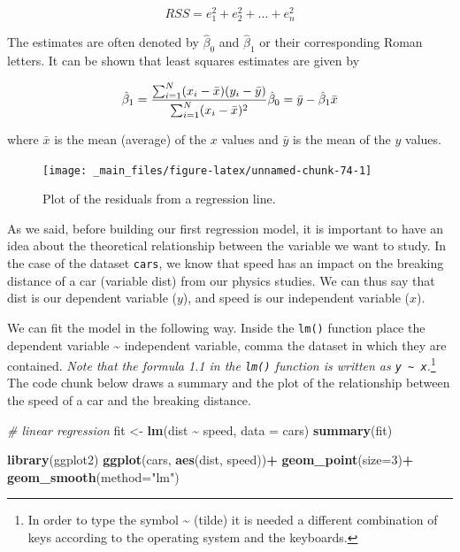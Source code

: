 \documentclass[
]{article}
\newenvironment{Shaded}{\begin{snugshade}}{\end{snugshade}}
\newcommand{\AttributeTok}[1]{\textcolor[rgb]{0.13,0.29,0.53}{#1}}
\newcommand{\CommentTok}[1]{\textcolor[rgb]{0.56,0.35,0.01}{\textit{#1}}}
\newcommand{\DecValTok}[1]{\textcolor[rgb]{0.00,0.00,0.81}{#1}}
\newcommand{\FunctionTok}[1]{\textcolor[rgb]{0.13,0.29,0.53}{\textbf{#1}}}
\newcommand{\NormalTok}[1]{#1}
\newcommand{\OtherTok}[1]{\textcolor[rgb]{0.56,0.35,0.01}{#1}}
\newcommand{\SpecialCharTok}[1]{\textcolor[rgb]{0.81,0.36,0.00}{\textbf{#1}}}
\newcommand{\StringTok}[1]{\textcolor[rgb]{0.31,0.60,0.02}{#1}}
\begin{document}
\begin{equation}
RSS=e_1^2+e_2^2+...+e_n^2
\label{eq:rss}
\end{equation}

The estimates are often denoted by \(\hat\beta_0\) and \(\hat\beta_1\) or
their corresponding Roman letters. It can be shown that least squares
estimates are given by

\begin{equation}
\hat\beta_1=\frac{\sum_{i=1}^N(x_i-\bar{x})(y_i-\bar{y})}{\sum_{i=1}^N(x_i-\bar{x})^2} \\
\hat\beta_0=\bar{y}-\hat\beta_1 \bar{x}
\end{equation}

where \(\bar{x}\) is the mean (average) of the \(x\) values and \(\bar{y}\)
is the mean of the \(y\) values.

\begin{figure}[H]

{\centering \texttt{[image: \_main\_files/figure-latex/unnamed-chunk-74-1]} 

}

\caption{Plot of the residuals from a regression line.}\label{fig:unnamed-chunk-74}
\end{figure}

As we said, before building our first regression model, it is important
to have an idea about the theoretical relationship between the variable
we want to study. In the case of the dataset \texttt{cars}, we know that speed
has an impact on the breaking distance of a car (variable dist) from our
physics studies. We can thus say that dist is our dependent variable
(\(y\)), and speed is our independent variable (\(x\)).

We can fit the model in the following way. Inside the \texttt{lm()} function
place the dependent variable \textasciitilde{} independent variable, comma the dataset
in which they are contained. \emph{Note that the formula 1.1 in the \texttt{lm()}
function is written as \texttt{y\ \textasciitilde{}\ x}.}\footnote{In order to type the symbol \textasciitilde{} (tilde) it is needed a different
  combination of keys according to the operating system and the
  keyboards.} The code chunk below draws a
summary and the plot of the relationship between the speed of a car and
the breaking distance.

\begin{Shaded}
\begin{Highlighting}[]
\CommentTok{\# linear regression}
\NormalTok{fit }\OtherTok{\textless{}{-}} \FunctionTok{lm}\NormalTok{(dist }\SpecialCharTok{\textasciitilde{}}\NormalTok{ speed, }\AttributeTok{data =}\NormalTok{ cars)}
\FunctionTok{summary}\NormalTok{(fit)}

\FunctionTok{library}\NormalTok{(ggplot2)}
\FunctionTok{ggplot}\NormalTok{(cars, }\FunctionTok{aes}\NormalTok{(dist, speed))}\SpecialCharTok{+}
        \FunctionTok{geom\_point}\NormalTok{(}\AttributeTok{size=}\DecValTok{3}\NormalTok{)}\SpecialCharTok{+}
        \FunctionTok{geom\_smooth}\NormalTok{(}\AttributeTok{method=}\StringTok{"lm"}\NormalTok{)}
\end{Highlighting}
\end{Shaded}
\end{document}
